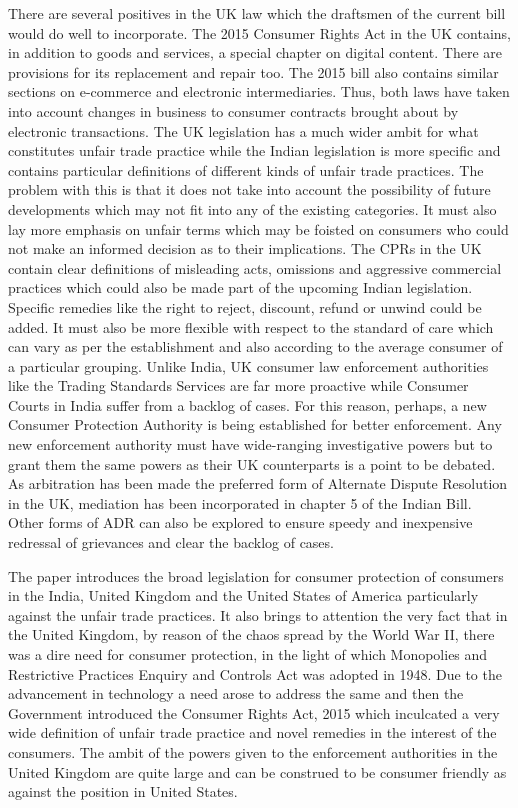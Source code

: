\begin{multicols}{2}
\noi
There are several positives in the UK law which the draftsmen of the current bill would do well
to incorporate. The 2015 Consumer Rights Act in the UK contains, in addition to goods and
services, a special chapter on digital content. There are provisions for its replacement and repair
too. The 2015 bill also contains similar sections on e-commerce and electronic intermediaries.
Thus, both laws have taken into account changes in business to consumer contracts brought
about by electronic transactions. The UK legislation has a much wider ambit for what
constitutes unfair trade practice while the Indian legislation is more specific and contains
particular definitions of different kinds of unfair trade practices. The problem with this is that
it does not take into account the possibility of future developments which may not fit into any
of the existing categories. It must also lay more emphasis on unfair terms which may be foisted
on consumers who could not make an informed decision as to their implications. The CPRs in
the UK contain clear definitions of misleading acts, omissions and aggressive commercial
practices which could also be made part of the upcoming Indian legislation. Specific remedies 
like the right to reject, discount, refund or unwind could be added. It must also be more flexible
with respect to the standard of care which can vary as per the establishment and also according
to the average consumer of a particular grouping. Unlike India, UK consumer law enforcement
authorities like the Trading Standards Services are far more proactive while Consumer Courts
in India suffer from a backlog of cases. For this reason, perhaps, a new Consumer Protection
Authority is being established for better enforcement. Any new enforcement authority must
have wide-ranging investigative powers but to grant them the same powers as their UK
counterparts is a point to be debated. As arbitration has been made the preferred form of
Alternate Dispute Resolution in the UK, mediation has been incorporated in chapter 5 of the
Indian Bill. Other forms of ADR can also be explored to ensure speedy and inexpensive
redressal of grievances and clear the backlog of cases.


\noi
The paper introduces the broad legislation for consumer protection of consumers in the India,
United Kingdom and the United States of America particularly against the unfair trade
practices. It also brings to attention the very fact that in the United Kingdom, by reason of the
chaos spread by the World War II, there was a dire need for consumer protection, in the light
of which Monopolies and Restrictive Practices Enquiry and Controls Act was adopted in 1948.
Due to the advancement in technology a need arose to address the same and then the
Government introduced the Consumer Rights Act, 2015 which inculcated a very wide
definition of unfair trade practice and novel remedies in the interest of the consumers. The
ambit of the powers given to the enforcement authorities in the United Kingdom are quite large
and can be construed to be consumer friendly as against the position in United States.


\end{multicols}
